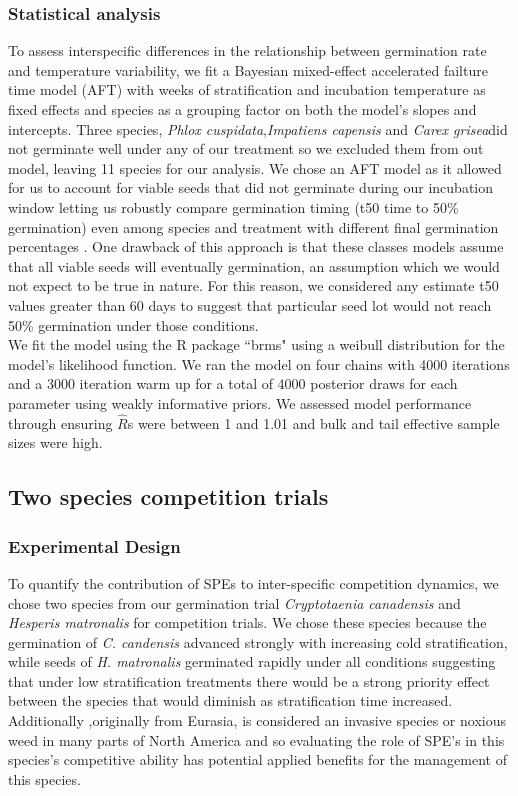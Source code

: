 \documentclass[11pt]{article}\usepackage[]{graphicx}\usepackage[]{color}
\begin{document}
\subsubsection*{Statistical analysis}
To assess interspecific differences in the relationship between germination rate and temperature variability, we fit a Bayesian mixed-effect accelerated failture time model (AFT) with weeks of stratification and incubation temperature as fixed effects and species as a grouping factor on both the model's slopes and intercepts. Three species, \textit{Phlox cuspidata},\textit{Impatiens capensis} and \textit{Carex grisea}did not germinate well under any of our treatment so we excluded them from out model, leaving 11 species for our analysis. We chose an AFT model as it allowed for us to account for viable seeds that did not germinate during our incubation window letting us robustly compare germination timing (t50 time to 50\% germination) even among species and treatment with different final germination percentages \citep{Soltani:2015aa}. One drawback of this approach is that these classes models assume that all viable seeds will eventually germination, an assumption which we would not expect to be true in nature. For this reason, we considered any estimate t50 values greater than 60 days to suggest that particular seed lot would not reach 50\% germination under those conditions.\\ %

\noindent We fit the model using the R package ``brms" \citep{Burkner2018} using a weibull distribution for the model's likelihood function. We ran the model on four chains with 4000 iterations and a 3000 iteration warm up for a total of 4000 posterior draws for each parameter using weakly informative priors. We assessed  model performance through ensuring $\hat{R}$s were between 1 and 1.01 and bulk and tail effective sample sizes were high.

\subsection{Two species competition trials}
\subsubsection*{Experimental Design}
To quantify the contribution of SPEs to inter-specific competition dynamics, we chose two species from our germination trial \textit{Cryptotaenia canadensis} and \textit{Hesperis matronalis} for competition trials. We chose these species because the germination of \textit{C. candensis} advanced strongly with increasing cold stratification, while seeds of \textit{H. matronalis} germinated rapidly under all conditions suggesting that under low stratification treatments there would be a strong priority effect between the species that would diminish as stratification time increased. Additionally ,originally from Eurasia, is considered an invasive species or noxious weed in many parts of North America and so evaluating the role of SPE's in this species's competitive ability has potential applied benefits for the management of this species.\\
\end{document}
